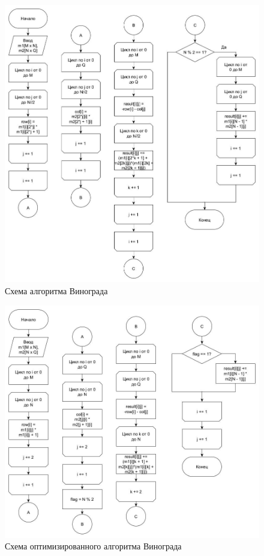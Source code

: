 \FloatBarrier
\begin{figure}[hp]
	\begin{center}
		\includegraphics[width=\linewidth]{graph/vinograd.jpg}
	\end{center}
	\caption{Схема алгоритма Винограда}
\end{figure}
\FloatBarrier

\FloatBarrier
\begin{figure}[hp]
	\begin{center}
		\includegraphics[width=\linewidth]{graph/optvinograd.jpg}
	\end{center}
	\caption{Схема оптимизированного алгоритма Винограда}
\end{figure}
\FloatBarrier

